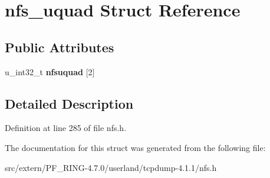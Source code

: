 \hypertarget{structnfs__uquad}{
\section{nfs\_\-uquad Struct Reference}
\label{structnfs__uquad}
}
\subsection*{Public Attributes}
\begin{DoxyCompactItemize}
\item 
\hypertarget{structnfs__uquad_a415c9e3bf75aa0aa9f5fd564a88861bd}{
u\_\-int32\_\-t {\bfseries nfsuquad} \mbox{[}2\mbox{]}}
\label{structnfs__uquad_a415c9e3bf75aa0aa9f5fd564a88861bd}

\end{DoxyCompactItemize}


\subsection{Detailed Description}


Definition at line 285 of file nfs.h.



The documentation for this struct was generated from the following file:\begin{DoxyCompactItemize}
\item 
src/extern/PF\_\-RING-\/4.7.0/userland/tcpdump-\/4.1.1/nfs.h\end{DoxyCompactItemize}
